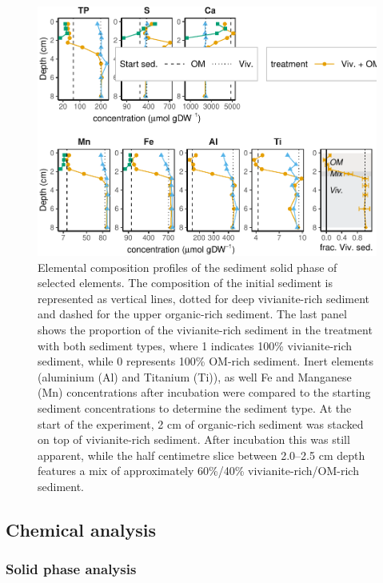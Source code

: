 \documentclass[12pt,twoside]{book}
\begin{document}
\begin{figure}
\centering
\includegraphics{my-thesis_files/figure-latex/IncubationComposition-1.pdf}
\caption{\label{fig:IncubationComposition}Elemental composition profiles of the sediment solid phase of selected elements. The composition of the initial sediment is represented as vertical lines, dotted for deep vivianite-rich sediment and dashed for the upper organic-rich sediment. The last panel shows the proportion of the vivianite-rich sediment in the treatment with both sediment types, where 1 indicates 100\% vivianite-rich sediment, while 0 represents 100\% OM-rich sediment. Inert elements (aluminium (Al) and Titanium (Ti)), as well Fe and Manganese (Mn) concentrations after incubation were compared to the starting sediment concentrations to determine the sediment type. At the start of the experiment, 2 cm of organic-rich sediment was stacked on top of vivianite-rich sediment. After incubation this was still apparent, while the half centimetre slice between 2.0--2.5 cm depth features a mix of approximately 60\%/40\% vivianite-rich/OM-rich sediment.}
\end{figure}

\subsection{Chemical analysis}\label{chemical-analysis}

\subsubsection{Solid phase analysis}\label{solid-phase-analysis}
\end{document}
